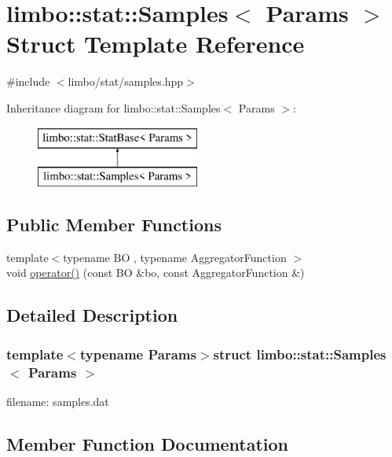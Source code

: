 \hypertarget{structlimbo_1_1stat_1_1_samples}{}\section{limbo\+:\+:stat\+:\+:Samples$<$ Params $>$ Struct Template Reference}
\label{structlimbo_1_1stat_1_1_samples}


{\ttfamily \#include $<$limbo/stat/samples.\+hpp$>$}

Inheritance diagram for limbo\+:\+:stat\+:\+:Samples$<$ Params $>$\+:\begin{figure}[H]
\begin{center}
\leavevmode
\includegraphics[height=2.000000cm]{structlimbo_1_1stat_1_1_samples}
\end{center}
\end{figure}
\subsection*{Public Member Functions}
\begin{DoxyCompactItemize}
\item 
{\footnotesize template$<$typename B\+O , typename Aggregator\+Function $>$ }\\void \hyperlink{structlimbo_1_1stat_1_1_samples_a456da8be91bd02cf82121d80d7531123}{operator()} (const B\+O \&bo, const Aggregator\+Function \&)
\end{DoxyCompactItemize}


\subsection{Detailed Description}
\subsubsection*{template$<$typename Params$>$struct limbo\+::stat\+::\+Samples$<$ Params $>$}

filename\+: {\ttfamily samples.\+dat} 

\subsection{Member Function Documentation}
\hypertarget{structlimbo_1_1stat_1_1_samples_a456da8be91bd02cf82121d80d7531123}{}
